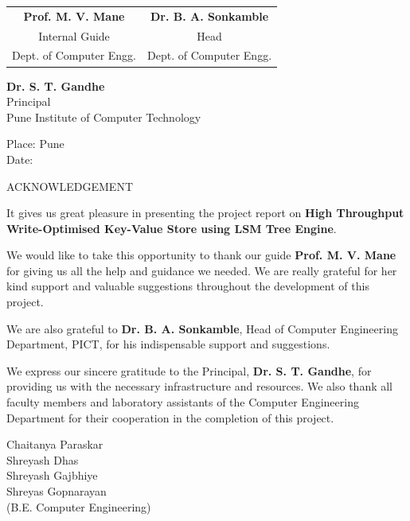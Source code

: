 \documentclass[oneside,a4paper,12pt]{book}
\begin{document}
\bgroup
\def\arraystretch{0.7}
\begin{tabular}{c c }
\textbf{Prof. M. V. Mane} &  \hspace{50 mm} \textbf{Dr. B. A. Sonkamble} \\
Internal Guide   &  \hspace{50 mm} Head \\
Dept. of Computer Engg.  &	\hspace{50 mm}Dept. of Computer Engg.  \\
\end{tabular}
\begin{center}
\vspace*{1\baselineskip}
{

\textbf{Dr. S. T. Gandhe}\\
Principal\\
Pune Institute of Computer Technology  
}
\end{center}
Place: Pune\\
Date:


\newpage
{\bfseries \fontsize{14}{17} \selectfont \centerline{ACKNOWLEDGEMENT}
\vspace*{2\baselineskip}}

\setlength{\parindent}{5em}

It gives us great pleasure in presenting the project report on \textbf{High Throughput Write-Optimised Key-Value Store using LSM Tree Engine}.

We would like to take this opportunity to thank our guide \textbf{Prof. M. V. Mane} for giving us all the help and guidance we needed. We are really grateful for her kind support and valuable suggestions throughout the development of this project.

We are also grateful to \textbf{Dr. B. A. Sonkamble}, Head of Computer Engineering Department, PICT, for his indispensable support and suggestions.

We express our sincere gratitude to the Principal, \textbf{Dr. S. T. Gandhe}, for providing us with the necessary infrastructure and resources. We also thank all faculty members and laboratory assistants of the Computer Engineering Department for their cooperation in the completion of this project.

\vspace*{3\baselineskip}
\begin{flushright}
Chaitanya Paraskar\\
Shreyash Dhas\\
Shreyash Gajbhiye\\
Shreyas Gopnarayan\\
(B.E. Computer Engineering)
\end{flushright}
\end{document}
